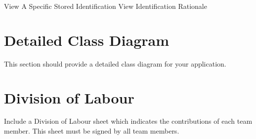 \documentclass[]{article}
\begin{document}
\begin{center}
	\newpage
	View A Specific Stored Identification
	\newpage
	View Identification Rationale
\end{center}

\section{Detailed Class Diagram}
\label{sec:detailed_class_diagram}
This section should provide a detailed class diagram for your application.

\appendix
\section{Division of Labour}
\label{sec:division_of_labour}
Include a Division of Labour sheet which indicates the contributions of each team member. This sheet must be signed by all team members.
\end{document}
